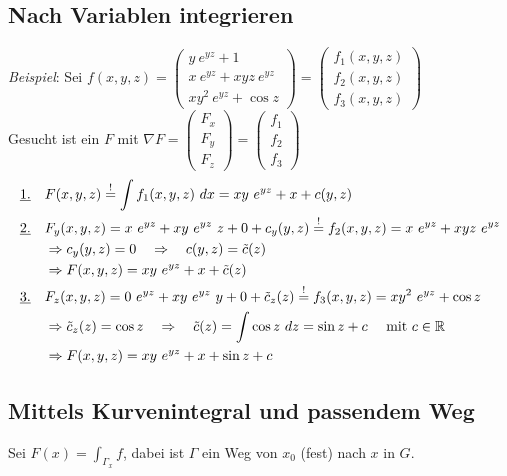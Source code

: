 \documentclass[11pt,a4paper]{book}
\newcommand {\R}	{\mathbb{R}}
\newcommand{\1}    	{\mathbbm{1}}
\newcommand{\mitt}	{\textrm{ mit }}
\begin{document}
\subsection{Nach Variablen integrieren}
\textit{Beispiel}: Sei \(f(x,y,z) = \left(\begin{array}{c}
	y~e^{yz} + 1 \\
	x~e^{yz} + xyz~e^{yz} \\
	xy^2~e^{yz} + \cos z
\end{array} \right) = \left( \begin{array}{c}
	f_1(x,y,z) \\
	f_2(x,y,z) \\
	f_3(x,y,z)
\end{array} \right) \)\\
Gesucht ist ein \(F\) mit \(\nabla F = \left( \begin{array}{c}
	F_x \\ F_y \\ F_z
\end{array} \right) = \left( \begin{array}{c}
	f_1 \\ f_2 \\ f_3
\end{array} \right)\)
\begin{align*}
	\textrm{\underline{1.}}\quad & 
	F(x,y,z) \stackrel{!}{=} \int f_1(x,y,z) ~dx = xy~e^{yz} + x + c(y,z) \\
	\textrm{\underline{2.}}\quad & 
	F_y(x,y,z) = x~e^{yz} + xy~e^{yz}~z + 0 + c_y(y,z) \stackrel{!}{=}
	f_2(x,y,z) = x~e^{yz} + xyz~e^{yz} \\
	&\Rightarrow c_y(y,z) = 0 \quad\Rightarrow\quad c(y,z) = \tilde{c}(z) \\
	&\Rightarrow F(x,y,z) = xy~e^{yz} + x + \tilde{c}(z) \\
	\textrm{\underline{3.}}\quad &
	F_z(x,y,z) = 0~e^{yz} + xy~e^{yz}~y + 0 + \tilde{c}_z(z) \stackrel{!}{=}
	f_3(x,y,z) = xy^2~e^{yz} + \cos z \\
	&\Rightarrow \tilde{c}_z(z) = \cos z \quad\Rightarrow\quad
	\tilde{c}(z) = \int \cos z ~dz = \sin z + c \quad\mitt c \in \R \\
	&\Rightarrow F(x,y,z) = xy~e^{yz} + x + \sin z + c
\end{align*}

\subsection{Mittels Kurvenintegral und passendem Weg}
Sei \(F(x)= \int_{\Gamma_x} f\), dabei ist \(\Gamma\) ein Weg von \(x_0\) (fest) nach \(x\) in \(G\).\\
\end{document}
